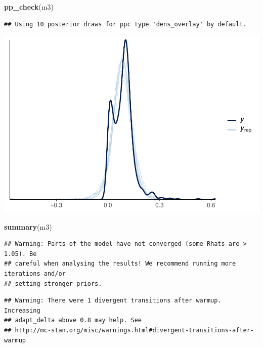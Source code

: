 \documentclass[
]{article}
\newenvironment{Shaded}{\begin{snugshade}}{\end{snugshade}}
\newcommand{\FunctionTok}[1]{\textcolor[rgb]{0.13,0.29,0.53}{\textbf{#1}}}
\newcommand{\NormalTok}[1]{#1}
\begin{document}
\begin{Shaded}
\begin{Highlighting}[]
\FunctionTok{pp\_check}\NormalTok{(m3)}
\end{Highlighting}
\end{Shaded}

\begin{verbatim}
## Using 10 posterior draws for ppc type 'dens_overlay' by default.
\end{verbatim}

\includegraphics{params_analyses_files/figure-latex/unnamed-chunk-4-2.pdf}

\begin{Shaded}
\begin{Highlighting}[]
\FunctionTok{summary}\NormalTok{(m3)}
\end{Highlighting}
\end{Shaded}

\begin{verbatim}
## Warning: Parts of the model have not converged (some Rhats are > 1.05). Be
## careful when analysing the results! We recommend running more iterations and/or
## setting stronger priors.
\end{verbatim}

\begin{verbatim}
## Warning: There were 1 divergent transitions after warmup. Increasing
## adapt_delta above 0.8 may help. See
## http://mc-stan.org/misc/warnings.html#divergent-transitions-after-warmup
\end{verbatim}
\end{document}
